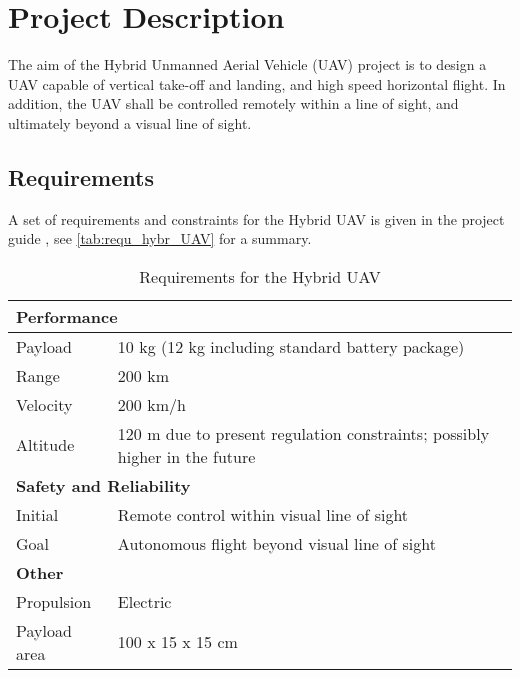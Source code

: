 \chapter{Project Description}
\label{ch:project_description}

The aim of the Hybrid Unmanned Aerial Vehicle (UAV) project is to design a UAV capable of vertical take-off and landing, and high speed horizontal flight. In addition, the UAV shall be controlled remotely within a line of sight, and ultimately beyond a visual line of sight.

\section{Requirements}

A set of requirements and constraints for the Hybrid UAV is given in the project guide \cite{dseguide}, see \autoref{tab:requ_hybr_UAV} for a summary.


\begin{table}[H]
    \centering
    \caption{Requirements for the Hybrid UAV}
    \label{tab:requ_hybr_UAV}
    \begin{tabularx}{\textwidth}{l l}
    \toprule
    \multicolumn{2}{l}{\textbf{Performance}}      \\ \toprule
      Payload     &  10 kg (12 kg including standard battery package) \\\hdashline
      Range         & 200 km                        \\\hdashline
      Velocity      & 200 km/h                      \\\hdashline
      Altitude      & 120 m due to present regulation constraints; possibly higher in the future        \\
      \midrule
      \multicolumn{2}{l}{\textbf{Safety and Reliability}}\\ \midrule
      Initial       & Remote control within visual line of sight                                         \\\hdashline
      Goal          & Autonomous flight beyond visual line of sight                                 \\
      \midrule
      \multicolumn{2}{l}{\textbf{Other}}\\ \midrule
      Propulsion            & Electric          \\\hdashline
      Payload area          & 100 x 15 x 15 cm     \\ 
      \bottomrule
    \end{tabularx}
\end{table}

